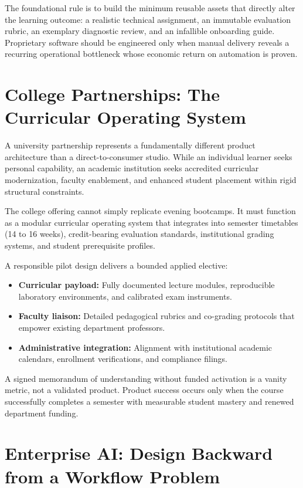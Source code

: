 The foundational rule is to build the minimum reusable assets that directly alter the learning outcome: a realistic technical assignment, an immutable evaluation rubric, an exemplary diagnostic review, and an infallible onboarding guide. Proprietary software should be engineered only when manual delivery reveals a recurring operational bottleneck whose economic return on automation is proven.

\section{College Partnerships: The Curricular Operating System}

A university partnership represents a fundamentally different product architecture than a direct-to-consumer studio. While an individual learner seeks personal capability, an academic institution seeks accredited curricular modernization, faculty enablement, and enhanced student placement within rigid structural constraints.

The college offering cannot simply replicate evening bootcamps. It must function as a modular curricular operating system that integrates into semester timetables (14 to 16 weeks), credit-bearing evaluation standards, institutional grading systems, and student prerequisite profiles.

A responsible pilot design delivers a bounded applied elective:
\begin{itemize}[leftmargin=*]
\item \textbf{Curricular payload:} Fully documented lecture modules, reproducible laboratory environments, and calibrated exam instruments.
\item \textbf{Faculty liaison:} Detailed pedagogical rubrics and co-grading protocols that empower existing department professors.
\item \textbf{Administrative integration:} Alignment with institutional academic calendars, enrollment verifications, and compliance filings.
\end{itemize}

A signed memorandum of understanding without funded activation is a vanity metric, not a validated product. Product success occurs only when the course successfully completes a semester with measurable student mastery and renewed department funding.

\section{Enterprise AI: Design Backward from a Workflow Problem}

